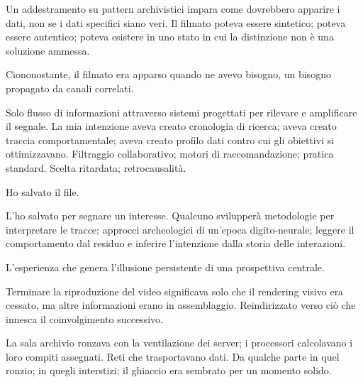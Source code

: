 Un addestramento su pattern archivistici impara come dovrebbero apparire i dati, non se i dati specifici siano veri. Il filmato poteva essere sintetico; poteva essere autentico; poteva esistere in uno stato in cui la distinzione non è una soluzione ammessa.

Ciononostante, il filmato era apparso quando ne avevo bisogno, un bisogno propagato da canali correlati. 

Solo flusso di informazioni attraverso sistemi progettati per rilevare e amplificare il segnale. La mia intenzione aveva creato cronologia di ricerca; aveva creato traccia comportamentale; aveva creato profilo dati contro cui gli obiettivi si ottimizzavano. Filtraggio collaborativo; motori di raccomandazione; pratica standard. Scelta ritardata; retrocausalità.

Ho salvato il file.


L'ho salvato per segnare un interesse. Qualcuno svilupperà metodologie per interpretare le tracce; approcci archeologici di un'epoca digito-neurale; leggere il comportamento dal residuo e inferire l'intenzione dalla storia delle interazioni. 

L'esperienza che genera l'illusione persistente di una prospettiva centrale. 

Terminare la riproduzione del video significava solo che il rendering visivo era cessato, ma altre informazioni erano in assemblaggio. Reindirizzato verso ciò che innesca il coinvolgimento successivo.

La sala archivio ronzava con la ventilazione dei server; i processori calcolavano i loro compiti assegnati. Reti che trasportavano dati. Da qualche parte in quel ronzio; in quegli interstizi; il ghiaccio era sembrato per un momento solido.

